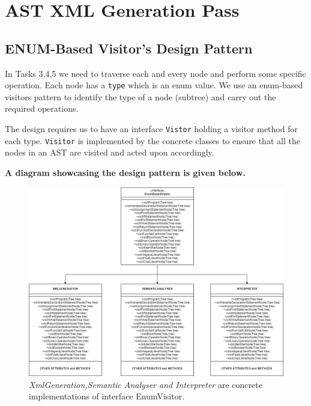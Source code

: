 \chapter{AST XML Generation Pass}
\section{ENUM-Based Visitor's Design Pattern}
In Tasks 3,4,5 we need to traverse each and every node and perform some specific operation. Each node has a \verb!type! which is an enum value. We use an enum-based visitors pattern  to identify the type of a node (subtree)  and carry out the required operations.


The design requires us to have an interface  \verb!Vistor! holding a visitor method for each type.  \verb!Visitor! is implemented by the concrete classes to ensure that all the nodes in an AST are visited and acted upon accordingly.

\textbf{A diagram showcasing the design pattern is given below.}

\begin{landscape}
	\begin{figure}[H]
		\centering
						        
		\includegraphics[scale=0.5]{Task345/images/UML.png}
						    
		\caption{\emph{XmlGeneration,Semantic Analyser and Interpreter} are concrete implementations of interface EnumVisitor.}
		\label{fig:enum based visitors design pattern}
	\end{figure}
\end{landscape}

